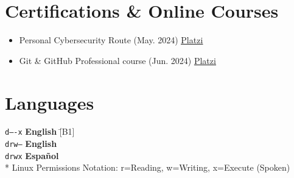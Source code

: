\documentclass[11pt,a4paper,sans]{moderncv}
\newcommand{\sectionMargin}{-3mm}
\begin{document}
\section{Certifications \& Online Courses}{
\begin{itemize}[label=\textbullet, noitemsep]
    \item Personal Cybersecurity Route (May. 2024) \href{https://1drv.ms/b/c/13c8ae619d64655e/EZYaMe6SBhJAshtvq4ORCQoBwWMYRerI4_xiuqXjORVd0w?e=I4tLqg}{\underline{Platzi}}
    \item Git \& GitHub Professional course (Jun. 2024) \href{https://1drv.ms/b/c/13c8ae619d64655e/EXeQGPrTCjFDpmx8pCItVTwB-OS1r-tkKJbmgYnahuxtYg?e=akKEsU}{\underline{Platzi}}
\end{itemize}
}

\vspace*{\sectionMargin}

\section{Languages}
\begin{tabbing}
  \texttt{d----x} \hspace{1mm}\= \textbf{English} \hspace{1mm}\= [B1] \\
  \texttt{drw--} \> \textbf{English} \> [Technical] \\
  \texttt{drwx} \> \textbf{Español} \> [Native] \\
  \** Linux Permissions Notation: r=Reading, w=Writing, x=Execute (Spoken)
\end{tabbing}
\end{document}
